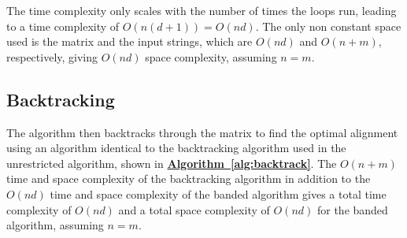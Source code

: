 \documentclass[12pt]{article}
\begin{document}
The time complexity only scales with the number of times the loops run,
leading to a time complexity of $O(n(d + 1)) =  O(nd)$. The only non
constant space used is the matrix and the input strings, which are $O(nd)$
and $O(n + m)$, respectively, giving $O(nd)$ space complexity, assuming
$n = m$.

\subsection{Backtracking}
The algorithm then backtracks through the matrix to find the optimal
alignment using an algorithm identical to the backtracking algorithm used
in the unrestricted algorithm, shown in 
\textbf{\hyperref[alg:backtrack]{Algorithm~\ref*{alg:backtrack}}}.
The $O(n + m)$ time and space complexity of the backtracking algorithm in 
addition to the $O(nd)$ time and space complexity of the banded algorithm
gives a total time complexity of $O(nd)$ and a total space complexity of $O(nd)$
for the banded algorithm, assuming $n = m$.
\end{document}
